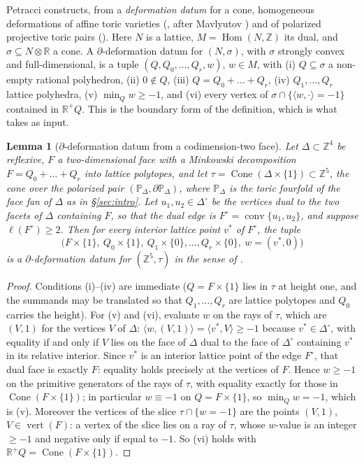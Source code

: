 \documentclass[11pt]{amsart}
\newtheorem{lemma}[theorem]{Lemma}
\theoremstyle{definition}
\theoremstyle{remark}
\newcommand{\ZZ}{\mathbb{Z}}
\newcommand{\PP}{\mathbb{P}}
\newcommand{\conv}{\operatorname{conv}}
\newcommand{\Cone}{\operatorname{Cone}}
\begin{document}
Petracci \cite{Petracci18} constructs, from a \emph{deformation datum}
for a cone, homogeneous deformations of affine toric varieties
(\cite[Def.~3.1, Thm.~3.5]{Petracci18}, after Mavlyutov \cite{Mav04}) and
of polarized projective toric pairs (\cite[Thm.~6.1]{Petracci18}).
Here $N$ is a lattice, $M = \operatorname{Hom}(N,\ZZ)$ its dual, and
$\sigma \subseteq N \otimes \mathbb{R}$ a cone.  A
$\partial$-deformation datum for $(N,\sigma)$, with $\sigma$ strongly convex and
full-dimensional, is a tuple $(Q, Q_0, \dots, Q_r, w)$, $w \in M$,
with (i) $Q \subseteq \sigma$ a non-empty rational polyhedron, (ii)
$0 \notin Q$, (iii)
$Q = Q_0 + \dots + Q_r$, (iv) $Q_1, \dots, Q_r$ lattice polyhedra, (v)
$\min_Q w \ge -1$, and (vi) every vertex of
$\sigma \cap \{\langle w, \cdot\rangle = -1\}$ contained in
$\mathbb{R}^+ Q$.  This is the boundary form of the definition, which is
what \cite[Thm.~6.1]{Petracci18} takes as input.

\begin{lemma}[$\partial$-deformation datum from a codimension-two face]\label{lem:datum}
Let $\Delta \subset \ZZ^4$ be reflexive, $F$ a two-dimensional face with
a Minkowski decomposition $F = Q_0 + \dots + Q_r$ into lattice polytopes,
and let $\tau = \Cone(\Delta\times\{1\}) \subset \ZZ^5$, the cone over the
polarized pair $(\PP_\Delta, \partial\PP_\Delta)$, where $\PP_\Delta$ is the
toric fourfold of the \emph{face fan} of $\Delta$ as in \S\ref{sec:intro}.  Let
$u_1, u_2 \in \Delta^\circ$ be the vertices dual to the two facets of
$\Delta$ containing $F$, so that the dual edge is
$F^\circ = \conv\{u_1, u_2\}$, and suppose $\ell(F^\circ) \ge 2$.  Then
for every \emph{interior} lattice point $v^\ast$ of $F^\circ$, the tuple
\[
\bigl(F\times\{1\},\ Q_0\times\{1\},\ Q_1\times\{0\}, \dots,
Q_r\times\{0\},\ w = (v^\ast, 0)\bigr)
\]
is a $\partial$-deformation datum for $(\ZZ^5, \tau)$ in the sense of
\textup{\cite[Def.~3.1]{Petracci18}}.
\end{lemma}

\begin{proof}
Conditions (i)--(iv) are immediate ($Q = F\times\{1\}$ lies in $\tau$ at
height one, and the summands may be translated so that $Q_1,\dots,Q_r$
are lattice polytopes and $Q_0$ carries the height).  For (v) and (vi),
evaluate $w$ on the rays of $\tau$, which are $(V,1)$ for the vertices
$V$ of $\Delta$: $\langle w, (V,1)\rangle = \langle v^\ast, V\rangle
\ge -1$ because $v^\ast \in \Delta^\circ$, with equality if and only if
$V$ lies on the face of $\Delta$ dual to the face of $\Delta^\circ$
containing $v^\ast$ in its relative interior.  Since $v^\ast$ is an
interior lattice point of the edge $F^\circ$, that dual face is exactly
$F$: equality holds precisely at the vertices of $F$.  Hence
$w \ge -1$ on the primitive generators of the rays of $\tau$, with
equality exactly for those in $\Cone(F\times\{1\})$; in particular
$w \equiv -1$ on $Q = F\times\{1\}$, so $\min_Q w = -1$, which is (v).
Moreover the
vertices of the slice $\tau \cap \{w = -1\}$ are the points $(V,1)$,
$V \in \operatorname{vert}(F)$: a vertex of the slice lies on a ray of
$\tau$, whose $w$-value is an integer $\ge -1$ and negative only if
equal to $-1$.  So (vi) holds with
$\mathbb{R}^+ Q = \Cone(F\times\{1\})$.
\end{proof}
\end{document}
